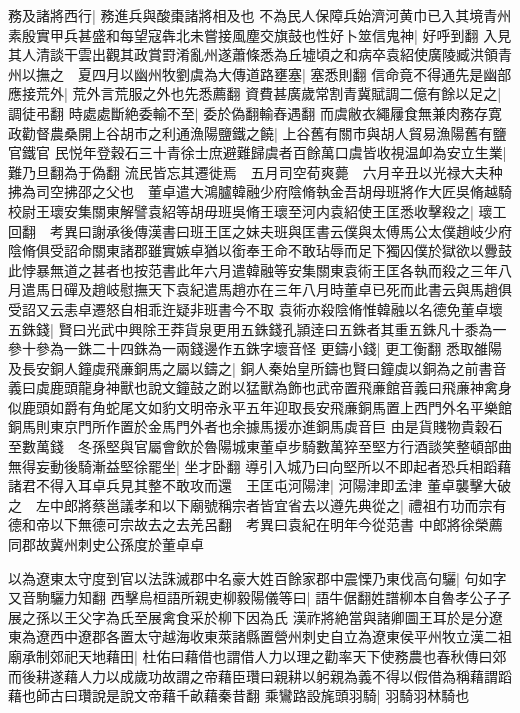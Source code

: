 務及諸將西行|{
	務進兵與酸棗諸將相及也}
不為民人保障兵始濟河黄巾已入其境青州素殷實甲兵甚盛和每望寇犇北未嘗接風塵交旗鼓也性好卜筮信鬼神|{
	好呼到翻}
入見其人清談干雲出觀其政賞罸淆亂州遂蕭條悉為丘墟頃之和病卒袁紹使廣陵臧洪領青州以撫之　夏四月以幽州牧劉虞為大傳道路壅塞|{
	塞悉則翻}
信命竟不得通先是幽部應接荒外|{
	荒外言荒服之外也先悉薦翻}
資費甚廣歲常割青冀賦調二億有餘以足之|{
	調徒弔翻}
時處處斷絶委輸不至|{
	委於偽翻輸舂遇翻}
而虞敝衣繩屨食無兼肉務存寛政勸督農桑開上谷胡市之利通漁陽鹽鐵之饒|{
	上谷舊有關市與胡人貿易漁陽舊有鹽官鐵官}
民悦年登穀石三十青徐士庶避難歸虞者百餘萬口虞皆收視温卹為安立生業|{
	難乃旦翻為于偽翻}
流民皆忘其遷徙焉　五月司空荀爽薨　六月辛丑以光禄大夫种拂為司空拂邵之父也　董卓遣大鴻臚韓融少府陰脩執金吾胡母班將作大匠吳脩越騎校尉王瓌安集關東解譬袁紹等胡毋班吳脩王瓌至河内袁紹使王匡悉收擊殺之|{
	瓌工回翻　考異曰謝承後傳漢書曰班王匡之妹夫班與匡書云僕與太傅馬公太僕趙岐少府陰脩俱受詔命關東諸郡雖實嫉卓猶以銜奉王命不敢玷辱而足下獨囚僕於獄欲以釁鼓此悖暴無道之甚者也按范書此年六月遣韓融等安集關東袁術王匡各執而殺之三年八月遣馬日磾及趙岐慰撫天下袁紀遣馬趙亦在三年八月時董卓已死而此書云與馬趙俱受詔又云恚卓遷怒自相乖迕疑非班書今不取}
袁術亦殺陰脩惟韓融以名德免董卓壞五銖錢|{
	賢曰光武中興除王莽貨泉更用五銖錢孔頴逹曰五銖者其重五銖凡十黍為一參十參為一銖二十四銖為一兩錢邊作五銖字壞音怪}
更鑄小錢|{
	更工衡翻}
悉取雒陽及長安銅人鐘虡飛亷銅馬之屬以鑄之|{
	銅人秦始皇所鑄也賢曰鐘虡以銅為之前書音義曰虡鹿頭龍身神獸也說文鐘鼓之跗以猛獸為飾也武帝置飛亷館音義曰飛亷神禽身似鹿頭如爵有角蛇尾文如豹文明帝永平五年迎取長安飛亷銅馬置上西門外名平樂館銅馬則東京門所作置於金馬門外者也余據馬援亦進銅馬虡音巨}
由是貨賤物貴穀石至數萬錢　冬孫堅與官屬會飲於魯陽城東董卓步騎數萬猝至堅方行酒談笑整頓部曲無得妄動後騎漸益堅徐罷坐|{
	坐才卧翻}
導引入城乃曰向堅所以不即起者恐兵相蹈藉諸君不得入耳卓兵見其整不敢攻而還　王匡屯河陽津|{
	河陽津即孟津}
董卓襲擊大破之　左中郎將蔡邕議孝和以下廟號稱宗者皆宜省去以遵先典從之|{
	禮祖冇功而宗有德和帝以下無德可宗故去之去羌呂翻　考異曰袁紀在明年今從范書}
中郎將徐榮薦同郡故冀州刺史公孫度於董卓卓

以為遼東太守度到官以法誅滅郡中名豪大姓百餘家郡中震慄乃東伐高句驪|{
	句如字又音駒驪力知翻}
西擊烏桓語所親吏柳毅陽儀等曰|{
	語牛倨翻姓譜柳本自魯孝公子子展之孫以王父字為氏至展禽食采於柳下因為氏}
漢祚將絶當與諸卿圖王耳於是分遼東為遼西中遼郡各置太守越海收東萊諸縣置營州刺史自立為遼東侯平州牧立漢二祖廟承制郊祀天地藉田|{
	杜佑曰藉借也謂借人力以理之勸率天下使務農也春秋傳曰郊而後耕遂藉人力以成歲功故謂之帝藉臣瓚曰親耕以躬親為義不得以假借為稱藉謂蹈藉也師古曰瓚說是說文帝藉千畝藉秦昔翻}
乘鸞路設旄頭羽騎|{
	羽騎羽林騎也}


